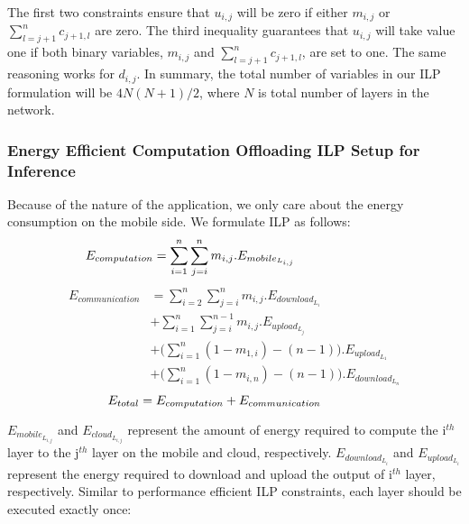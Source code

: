 The first two constraints ensure that $u_{i,j}$ will be zero if either $m_{i,j}$ or $\sum_{l=j+1}^{n}{c_{j+1,l}}$ are zero. The third inequality guarantees that $u_{i,j}$ will take value one if both binary variables, $m_{i,j}$ and $\sum_{l=j+1}^{n}{c_{j+1,l}}$, are set to one. The same reasoning works for $d_{i,j}$. In summary, the total number of variables in our ILP formulation will be $4N(N+1)/2$, where $N$ is total number of layers in the network. 

\subsubsection{Energy Efficient Computation Offloading ILP Setup for Inference}
Because of the nature of the application, we only care about the energy consumption on the mobile side. We formulate ILP as follows:
  \begin{equation}
      \begin{split}
E_{computation} &= \sum_{i=1}^{n}{\sum_{j=i}^{n}{
m_{i,j}.E_{mobile_{L_{i,j}}}}\thinspace\thinspace\thinspace\thinspace\thinspace\thinspace\thinspace\thinspace\thinspace\thinspace\thinspace\thinspace\thinspace\thinspace\thinspace\thinspace\thinspace\thinspace\thinspace\thinspace\thinspace\thinspace\thinspace\thinspace\thinspace\thinspace\thinspace\thinspace\thinspace\thinspace\thinspace\thinspace\thinspace\thinspace\thinspace\thinspace}\label{eq: energy_comp}
  \end{split}
\end{equation}
  \begin{equation}
      \begin{split}
E_{communication} &= \sum_{i=2}^{n}{\sum_{j=i}^{n}{m_{i,j}.E_{download_{L_i}}}} \\
& + \sum_{i=1}^{n}{\sum_{j=i}^{n-1}{m_{i,j}.E_{upload_{L_j}}}} \\
& + (\sum_{i=1}^{n}{(1-m_{1,i}) - (n-1)).E_{upload_{L_1}}} \\
& + (\sum_{i=1}^{n}{(1-m_{i,n}) - (n-1)).E_{download_{L_n}}}\label{eq: energy_comm}
  \end{split}
\end{equation}
  \begin{equation}
E_{total} = E_{computation} + E_{communication}\thinspace\thinspace\thinspace\thinspace\thinspace\thinspace\thinspace\thinspace\thinspace\thinspace\thinspace\thinspace\thinspace\thinspace\thinspace\thinspace\thinspace\thinspace\thinspace
\end{equation}

$E_{mobile_{L_{i,j}}}$ and $E_{cloud_{L_{i,j}}}$ represent the amount of energy required to compute the i$^{th}$ layer to the j$^{th}$ layer on the mobile and cloud, respectively. $E_{download_{L_i}}$ and $E_{upload_{L_i}}$ represent the energy required to download and upload the output of i$^{th}$ layer, respectively.
Similar to performance efficient ILP constraints, each layer should be executed exactly once:

